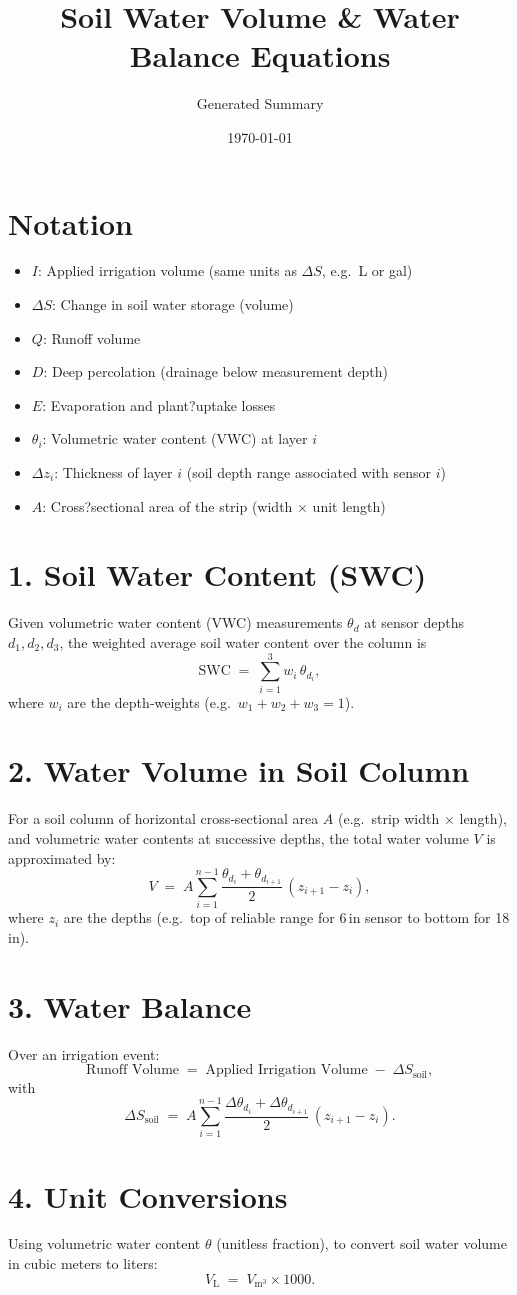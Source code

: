 \documentclass{article}
\title{Soil Water Volume \& Water Balance Equations}
\author{Generated Summary}
\date{\today}
\begin{document}
\maketitle

\section*{Notation}
\begin{itemize}
  \item $I$: Applied irrigation volume (same units as $\Delta S$, e.g.\ L or gal)
  \item $\Delta S$: Change in soil water storage (volume)
  \item $Q$: Runoff volume
  \item $D$: Deep percolation (drainage below measurement depth)
  \item $E$: Evaporation and plant?uptake losses
  \item $\theta_i$: Volumetric water content (VWC) at layer $i$
  \item $\Delta z_i$: Thickness of layer $i$ (soil depth range associated with sensor $i$)
  \item $A$: Cross?sectional area of the strip (width \(\times\) unit length)
\end{itemize}

\section*{1. Soil Water Content (SWC)}
Given volumetric water content (VWC) measurements $\theta_d$ at sensor depths $d_1, d_2, d_3$,
the weighted average soil water content over the column is
\[
\mathrm{SWC} \;=\; \sum_{i=1}^{3} w_i \,\theta_{d_i},
\]
where $w_i$ are the depth‐weights (e.g.\ $w_1 + w_2 + w_3 = 1$).

\section*{2. Water Volume in Soil Column}
For a soil column of horizontal cross‐sectional area $A$ (e.g.\ strip width $\times$ length),
and volumetric water contents at successive depths, the total water volume $V$ is approximated by:
\[
V \;=\; A \sum_{i=1}^{n-1} \frac{\theta_{d_i} + \theta_{d_{i+1}}}{2}\,(z_{i+1} - z_i),
\]
where $z_i$ are the depths (e.g.\ top of reliable range for 6\,in sensor to bottom for 18\,in).

\section*{3. Water Balance}
Over an irrigation event:
\[
\text{Runoff Volume}
\;=\;
\text{Applied Irrigation Volume}
\;-\;
\Delta S_{\text{soil}},
\]
with
\[
\Delta S_{\text{soil}}
\;=\;
A \sum_{i=1}^{n-1} \frac{\Delta \theta_{d_i} + \Delta \theta_{d_{i+1}}}{2}\,(z_{i+1} - z_i).
\]

\section*{4. Unit Conversions}
Using volumetric water content $\theta$ (unitless fraction),
to convert soil water volume in cubic meters to liters:
\[
V_{\mathrm{L}} \;=\; V_{\mathrm{m^3}} \times 1000.
\]
\end{document}
